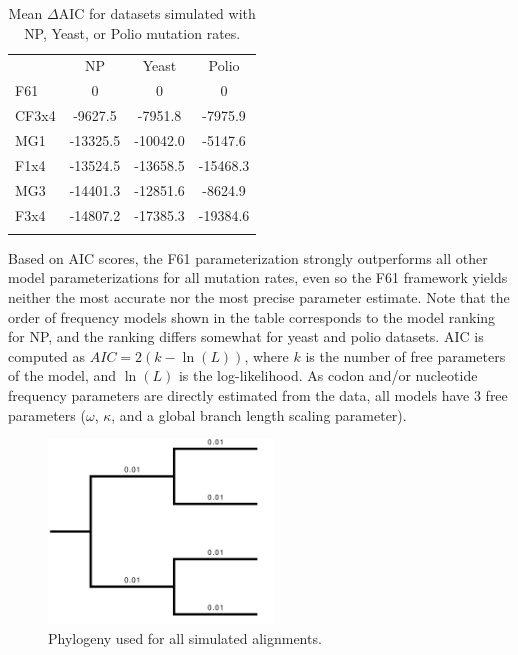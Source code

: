 \documentclass[11pt]{article}
\begin{document}
\begin{table}[htbp]
	\caption {\label{tab:dAIC} Mean $\Delta$AIC for datasets simulated with NP, Yeast, or Polio mutation rates.}
	\begin{tabular}{l c c c}
		\hline\noalign{\smallskip}
		\multicolumn{1}{c}{Frequencies} & NP & Yeast & Polio \\
		\noalign{\smallskip}\hline\noalign{\smallskip}
		F61 & 0 & 0 & 0 \\ 
		CF3x4 & -9627.5 & -7951.8 & -7975.9 \\ 
		MG1 & -13325.5 & -10042.0 & -5147.6 \\ 
		F1x4 & -13524.5 & -13658.5 & -15468.3 \\ 
		MG3 & -14401.3 & -12851.6 & -8624.9 \\ 
		F3x4 & -14807.2 & -17385.3 & -19384.6 \\ 
		\noalign{\smallskip}\hline\noalign{\smallskip} 
	\end{tabular}
	Based on AIC scores, the F61 parameterization strongly outperforms all other model parameterizations for all mutation rates, even so the F61 framework yields neither the most accurate nor the most precise parameter estimate. Note that the order of frequency models shown in the table corresponds to the model ranking for NP, and the ranking differs somewhat for yeast and polio datasets. AIC is computed as $AIC = 2(k - \ln(L))$, where $k$ is the number of free parameters of the model, and $\ln(L)$ is the log-likelihood. As codon and/or nucleotide frequency parameters are directly estimated from the data, all models have 3 free parameters ($\omega$, $\kappa$, and a global branch length scaling parameter).
\end{table}

\vspace{2cm}


\begin{figure}[htbp]
	\centerline{\includegraphics[width=6cm]{figures/MainText/simtree.pdf}}
	\caption{\label{tree} Phylogeny used for all simulated alignments.}	
\end{figure}
\end{document}
